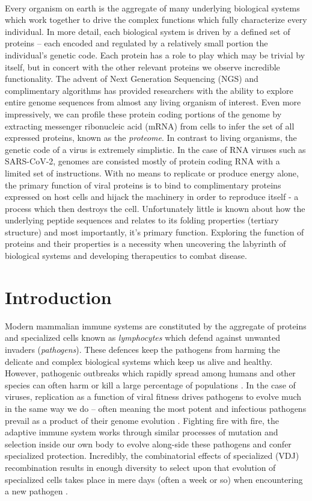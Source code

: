 \documentclass{article}
\begin{document}
~

Every organism on earth is the aggregate of many underlying biological systems which work together to drive the complex functions which fully characterize every individual.
In more detail, each biological system is driven by a defined set of proteins -- each encoded and regulated by a relatively small portion the individual's genetic code.
Each protein has a role to play which may be trivial by itself, but in concert with the other relevant proteins we observe incredible functionality. 
The advent of Next Generation Sequencing (NGS) and complimentary algorithms has provided researchers with the ability to explore entire genome sequences from almost any living organism of interest.
Even more impressively, we can profile these protein coding portions of the genome by extracting messenger ribonucleic acid (mRNA) from cells to infer the set of all expressed proteins, known as the \textit{proteome}. 
In contrast to living organisms, the genetic code of a virus is extremely simplistic. 
In the case of RNA viruses such as SARS-CoV-2, genomes are consisted mostly of protein coding RNA with a limited set of instructions.
With no means to replicate or produce energy alone, the primary function of viral proteins is to bind to complimentary proteins expressed on host cells and hijack the machinery in order to reproduce itself - a process which then destroys the cell.
Unfortunately little is known about how the underlying peptide sequences and relates to its folding properties (tertiary structure) and most importantly, it's primary function.
Exploring the function of proteins and their properties is a necessity when uncovering the labyrinth of biological systems and developing therapeutics to combat disease.

\section*{Introduction}

Modern mammalian immune systems are constituted by the aggregate of proteins and specialized cells known as \textit{lymphocytes} which defend against unwanted invaders (\textit{pathogens}).
These defences keep the pathogens from harming the delicate and complex biological systems which keep us alive and healthy.
However, pathogenic outbreaks which rapidly spread among humans and other species can often harm or kill a large percentage of populations \citep{Wu2020}.
In the case of viruses, replication as a function of viral fitness drives pathogens to evolve much in the same way we do -- often meaning the most potent and infectious pathogens prevail as a product of their genome evolution \citep{Twiddy2003, Felsenstein1981-zs}.
Fighting fire with fire, the adaptive immune system works through similar processes of mutation and selection inside our own body to evolve along-side these pathogens and confer specialized protection.
Incredibly, the combinatorial effects of specialized (VDJ) recombination results in enough diversity to select upon that evolution of specialized cells
takes place in mere days (often a week or so) when encountering a new pathogen \citep{Jung2004}.
\end{document}
